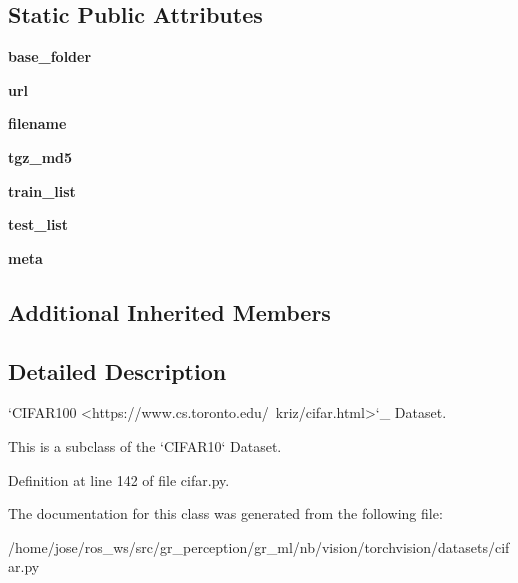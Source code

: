 \subsection*{Static Public Attributes}
\begin{DoxyCompactItemize}
\item 
\mbox{\label{classtorchvision_1_1datasets_1_1cifar_1_1CIFAR100_a976bbccd148133891d2db1e659dc5adc}} 
{\bfseries base\+\_\+folder}
\item 
\mbox{\label{classtorchvision_1_1datasets_1_1cifar_1_1CIFAR100_aa004470c43cdc6d9ea575a1ca485b2bd}} 
{\bfseries url}
\item 
\mbox{\label{classtorchvision_1_1datasets_1_1cifar_1_1CIFAR100_ada339f6e20d371baf22811a39d55dd7e}} 
{\bfseries filename}
\item 
\mbox{\label{classtorchvision_1_1datasets_1_1cifar_1_1CIFAR100_accb4027792722231f68fcc13b6b310b2}} 
{\bfseries tgz\+\_\+md5}
\item 
\mbox{\label{classtorchvision_1_1datasets_1_1cifar_1_1CIFAR100_aa0f32b7e13f7560b14e121d9cbe35d83}} 
{\bfseries train\+\_\+list}
\item 
\mbox{\label{classtorchvision_1_1datasets_1_1cifar_1_1CIFAR100_a91c8cf5ede0170d5e5e9328d3118c7c1}} 
{\bfseries test\+\_\+list}
\item 
\mbox{\label{classtorchvision_1_1datasets_1_1cifar_1_1CIFAR100_a7346d47c58ebab34742cdc8e233ea0ea}} 
{\bfseries meta}
\end{DoxyCompactItemize}
\subsection*{Additional Inherited Members}


\subsection{Detailed Description}
\begin{DoxyVerb}`CIFAR100 <https://www.cs.toronto.edu/~kriz/cifar.html>`_ Dataset.

This is a subclass of the `CIFAR10` Dataset.
\end{DoxyVerb}
 

Definition at line 142 of file cifar.\+py.



The documentation for this class was generated from the following file\+:\begin{DoxyCompactItemize}
\item 
/home/jose/ros\+\_\+ws/src/gr\+\_\+perception/gr\+\_\+ml/nb/vision/torchvision/datasets/cifar.\+py\end{DoxyCompactItemize}

